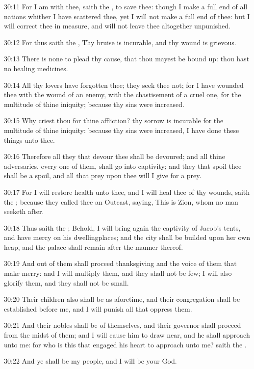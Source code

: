 30:11 For I am with thee, saith the \LORD, to save thee: though I make a full end of all nations whither I have scattered thee, yet I will not make a full end of thee: but I will correct thee in measure, and will not leave thee altogether unpunished.

30:12 For thus saith the \LORD, Thy bruise is incurable, and thy wound is grievous.

30:13 There is none to plead thy cause, that thou mayest be bound up: thou hast no healing medicines.

30:14 All thy lovers have forgotten thee; they seek thee not; for I have wounded thee with the wound of an enemy, with the chastisement of a cruel one, for the multitude of thine iniquity; because thy sins were increased.

30:15 Why criest thou for thine affliction? thy sorrow is incurable for the multitude of thine iniquity: because thy sins were increased, I have done these things unto thee.

30:16 Therefore all they that devour thee shall be devoured; and all thine adversaries, every one of them, shall go into captivity; and they that spoil thee shall be a spoil, and all that prey upon thee will I give for a prey.

30:17 For I will restore health unto thee, and I will heal thee of thy wounds, saith the \LORD; because they called thee an Outcast, saying, This is Zion, whom no man seeketh after.

30:18 Thus saith the \LORD; Behold, I will bring again the captivity of Jacob's tents, and have mercy on his dwellingplaces; and the city shall be builded upon her own heap, and the palace shall remain after the manner thereof.

30:19 And out of them shall proceed thanksgiving and the voice of them that make merry: and I will multiply them, and they shall not be few; I will also glorify them, and they shall not be small.

30:20 Their children also shall be as aforetime, and their congregation shall be established before me, and I will punish all that oppress them.

30:21 And their nobles shall be of themselves, and their governor shall proceed from the midst of them; and I will cause him to draw near, and he shall approach unto me: for who is this that engaged his heart to approach unto me? saith the \LORD.

30:22 And ye shall be my people, and I will be your God.

